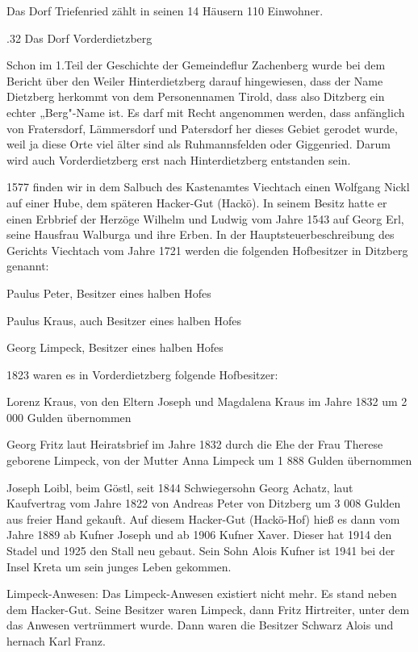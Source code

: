 Das Dorf Triefenried zählt in seinen 14 Häusern 110 Einwohner.

.32 Das Dorf Vorderdietzberg

Schon im 1.Teil der Geschichte der Gemeindeflur Zachenberg wurde bei dem Bericht
über den Weiler Hinterdietzberg darauf hingewiesen, dass der Name Dietzberg
herkommt von dem Personennamen Tirold, dass also Ditzberg ein echter „Berg"-Name
ist. Es darf mit Recht angenommen werden, dass anfänglich von Fratersdorf,
Lämmersdorf und Patersdorf her dieses Gebiet gerodet wurde, weil ja diese Orte
viel älter sind als Ruhmannsfelden oder Giggenried. Darum wird auch
Vorderdietzberg erst nach Hinterdietzberg entstanden sein.

1577 finden wir in dem Salbuch des Kastenamtes Viechtach einen Wolfgang Nickl
auf einer Hube, dem späteren Hacker-Gut (Hackö). In seinem Besitz hatte er einen
Erbbrief der Herzöge Wilhelm und Ludwig vom Jahre 1543 auf Georg Erl, seine
Hausfrau Walburga und ihre Erben. In der Hauptsteuerbeschreibung des Gerichts
Viechtach vom Jahre 1721 werden die folgenden Hofbesitzer in Ditzberg genannt:



Paulus Peter, Besitzer eines halben Hofes

Paulus Kraus, auch Besitzer eines halben Hofes

Georg Limpeck, Besitzer eines halben Hofes



1823 waren es in Vorderdietzberg folgende Hofbesitzer:



Lorenz Kraus, von den Eltern Joseph und Magdalena Kraus im Jahre 1832 um 2 000
Gulden übernommen

Georg Fritz laut Heiratsbrief im Jahre 1832 durch die Ehe der Frau Therese
geborene Limpeck, von der Mutter Anna Limpeck um 1 888 Gulden übernommen

Joseph Loibl, beim Göstl, seit 1844 Schwiegersohn Georg Achatz, laut Kaufvertrag
vom Jahre 1822 von Andreas Peter von Ditzberg um 3 008 Gulden aus freier Hand
gekauft. Auf diesem Hacker-Gut (Hackö-Hof) hieß es dann vom Jahre 1889 ab Kufner
Joseph und ab 1906 Kufner Xaver. Dieser hat 1914 den Stadel und 1925 den Stall
neu gebaut. Sein Sohn Alois Kufner ist 1941 bei der Insel Kreta um sein junges
Leben gekommen.



Limpeck-Anwesen: Das Limpeck-Anwesen existiert nicht mehr. Es stand neben dem
Hacker-Gut. Seine Besitzer waren Limpeck, dann Fritz Hirtreiter, unter dem das
Anwesen vertrümmert wurde. Dann waren die Besitzer Schwarz Alois und hernach
Karl Franz.

